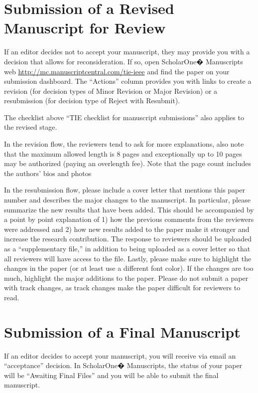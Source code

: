 \documentclass[journal]{IEEEtranTIE}
\begin{document}
\section{Submission of a Revised Manuscript for Review}

If an editor decides not to accept your manuscript, they may provide you with a decision that allows for reconsideration. If so, open ScholarOne� Manuscripts web \url{http://mc.manuscriptcentral.com/tie-ieee} and find the paper on your submission dashboard. The ``Actions'' column provides you with links to create a revision (for decision types of Minor Revision or Major Revision) or a resubmission (for decision type of Reject with Resubmit).

The checklist above ``TIE checklist for manuscript submissions'' also applies to the revised stage.

In the revision flow, the reviewers tend to ask for more explanations, also note that the maximum allowed length is 8 pages and exceptionally up to 10 pages may be authorized (paying an overlength fee). Note that the page count includes the authors' bios and photos

In the resubmission flow, please include a cover letter that mentions this paper number and describes the major changes to the manuscript. In particular, please summarize the new results that have been added. This should be accompanied by a point by point explanation of 1) how the previous comments from the reviewers were addressed and 2) how new results added to the paper make it stronger and increase the research contribution. The response to reviewers should be uploaded as a ``supplementary file,'' in addition to being uploaded as a cover letter so that all reviewers will have access to the file. Lastly, please make sure to highlight the changes in the paper (or at least use a different font color). If the changes are too much, highlight the major additions to the paper. Please do not submit a paper with track changes, as track changes make the paper difficult for reviewers to read.


\section{Submission of a Final Manuscript}

If an editor decides to accept your manuscript, you will receive via email an ``acceptance'' decision. In ScholarOne� Manuscripts, the status of your paper will be ``Awaiting Final Files'' and you will be able to submit the final manuscript.
\end{document}
